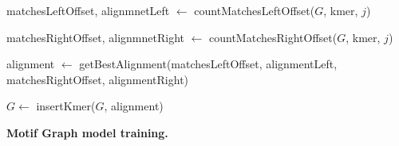\documentclass[a4paper, titlepage, openright]{book}
\begin{document}
\begin{algorithm}
	\DontPrintSemicolon
	
	{
	}

	{
		matchesLeftOffset, alignmnetLeft $\gets$ countMatchesLeftOffset($G$, kmer, $j$)
	}

	{
		matchesRightOffset, alignmnetRight $\gets$ countMatchesRightOffset($G$, kmer, $j$)
	}	
	
	alignment $\gets$ getBestAlignment(matchesLeftOffset, alignmentLeft, matchesRightOffset, alignmentRight)

	$G \gets$ insertKmer($G$, alignment)

	\caption{\textbf{Motif Graph model training.}}
	\label{algo:mt_mg}
\end{algorithm}
\end{document}
